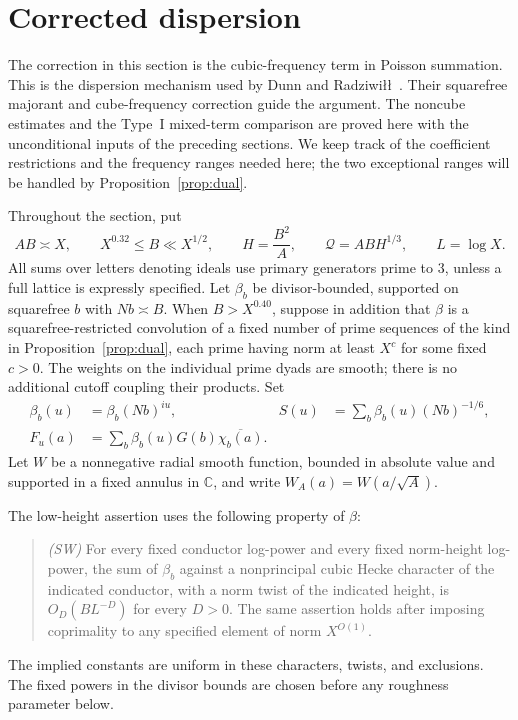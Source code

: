 \section{Corrected dispersion}
\label{sec:dispersion}

The correction in this section is the cubic-frequency term in Poisson
summation. This is the dispersion mechanism used by Dunn and
Radziwi\l\l~\cite[Section 9, Propositions 9.1--9.2]{DR2024}.
Their squarefree majorant and cube-frequency correction guide the
argument. The noncube estimates and the Type~I mixed-term comparison
are proved here with the unconditional inputs of the preceding sections.
We keep track of the coefficient restrictions
and the frequency ranges needed here; the two exceptional ranges will be
handled by Proposition~\ref{prop:dual}.

Throughout the section, put
\begin{equation}
 AB\asymp X,\qquad X^{0.32}\le B\ll X^{1/2},\qquad
 H=\frac{B^2}{A},\qquad \mathcal Q=ABH^{1/3},\qquad L=\log X.
 \label{eq:dispersion-scales}
\end{equation}
All sums over letters denoting ideals use primary generators prime to
$3$, unless a full lattice is expressly specified. Let $\beta_b$ be
divisor-bounded, supported on squarefree $b$ with $Nb\asymp B$. When
$B>X^{0.40}$, suppose in addition that $\beta$ is a squarefree-restricted
convolution of a fixed number of prime sequences of the kind in
Proposition~\ref{prop:dual}, each prime having norm at least $X^c$ for
some fixed $c>0$. The weights on the individual prime dyads are smooth;
there is no additional cutoff coupling their products. Set
\begin{equation}
 \begin{aligned}
 \beta_b(u)&=\beta_b(Nb)^{iu},&
 S(u)&=\sum_b\beta_b(u)(Nb)^{-1/6},\\
 F_u(a)&=\sum_b\beta_b(u)G(b)\overline{\chi_b(a)}.
 \end{aligned}
 \label{eq:dispersion-polynomials}
\end{equation}
Let $W$ be a nonnegative radial smooth function, bounded in absolute
value and supported in a fixed annulus in $\mathbb C$, and write
$W_A(a)=W(a/\sqrt A)$.

The low-height assertion uses the following property of $\beta$:
\begin{quote}
\emph{(SW)} For every fixed conductor log-power and every fixed
norm-height log-power, the sum of $\beta_b$ against a nonprincipal cubic
Hecke character of the indicated conductor, with a norm twist of the
indicated height, is $O_D(BL^{-D})$ for every $D>0$. The same assertion
holds after imposing coprimality to any specified element of norm
$X^{O(1)}$.
\end{quote}
The implied constants are uniform in these characters, twists, and
exclusions. The fixed powers in the divisor bounds are chosen before any
roughness parameter below.

